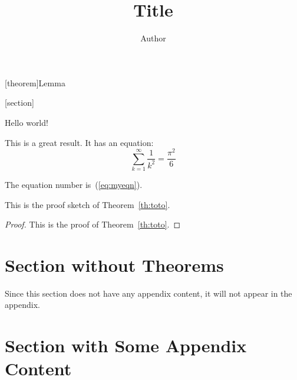 \usepackage{hyperref}

\theoremstyle{plain}

[theorem]{Lemma}

[section]

\renewcommand{\appendixsectionformat}[2]{Material for #2 (Section~#1)}
\renewcommand{\appendixrefname}{Appendix References}

\title{Title}
\author{Author}



\maketitle

Hello world!

\begin{theoremrep}
  \label{th:toto}%
  This is a great result. It has an equation:
  \begin{equation}
    \label{eq:myeqn}
    \sum_{k=1}^\infty \frac1{k^2}=\frac{\pi^2}6
 \end{equation}
\end{theoremrep}

The equation number is~(\ref{eq:myeqn}).

\begin{proofsketch}
  This is the proof sketch of Theorem~\ref{th:toto}.
\end{proofsketch}

\begin{proof}
  This is the proof of Theorem~\ref{th:toto}.
\end{proof}

\section{Section without Theorems}

Since this section does not have any appendix content, it will not appear in the
appendix. \cite{brin1998anatomy}

\section{Section with Some Appendix Content}

